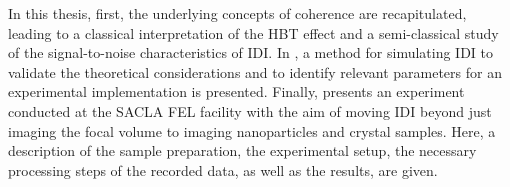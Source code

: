 In this thesis, first, the underlying concepts of coherence are recapitulated, leading to a classical interpretation of the HBT effect and a semi-classical study of the signal-to-noise characteristics of IDI. In , a method for simulating IDI to validate the theoretical considerations and to identify relevant parameters for an experimental implementation is presented.  Finally,  presents an experiment conducted at the SACLA FEL facility with the aim of moving IDI beyond just imaging the focal volume to imaging nanoparticles and crystal samples. Here, a description of the sample preparation, the experimental setup, the necessary processing steps of the recorded data, as well as the results, are given.

